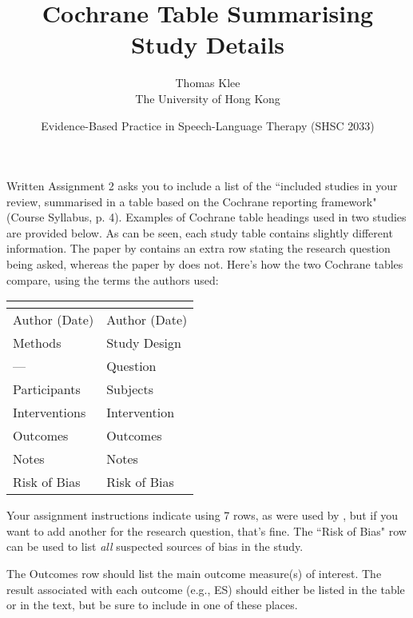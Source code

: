 \documentclass[a4paper]{article}
\title{Cochrane Table Summarising Study Details}
\author{Thomas Klee  \\ The University of Hong Kong}
\date{Evidence-Based Practice in Speech-Language Therapy (SHSC 2033)}
\begin{document}
\maketitle

Written Assignment 2 asks you to include a list of the ``included studies in your review, summarised in a table based on the Cochrane reporting framework" (Course Syllabus, p. 4). Examples of Cochrane table headings used in two studies are provided below. As can be seen, each study table contains slightly different information. The paper by \citet{Meinusch2011} contains an extra row stating the research question being asked, whereas the paper by \citet{Law2003b} does not. Here's how the two Cochrane tables compare, using the terms the authors used:

\begin{center}
\begin{tabular}{l l}
\toprule
\citet[p. 26]{Law2003b} & \citet[Appendix]{Meinusch2011} \\
\midrule
Author (Date)	& Author (Date) \\
Methods	& Study Design \\
---		& Question \\
Participants	& Subjects \\
Interventions	& Intervention \\
Outcomes	& Outcomes \\
Notes		& Notes \\
Risk of Bias	& Risk of Bias \\
\bottomrule
\end{tabular}
\end{center}

Your assignment instructions indicate using 7 rows, as were used by \citet{Law2003b}, but if you want to add another for the research question, that's fine. The ``Risk of Bias" row can be used to list \emph{all} suspected sources of bias in the study.

The Outcomes row should list the main outcome measure(s) of interest. The result associated with each outcome (e.g., ES) should either be listed in the table or in the text, but be sure to include in one of these places. 



\end{document}
